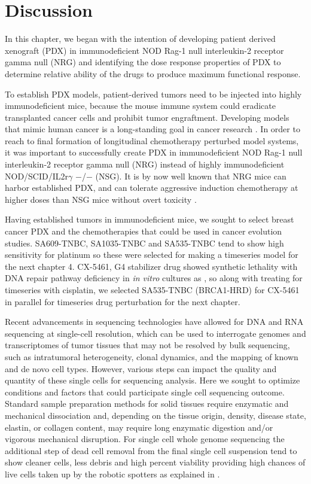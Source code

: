 \section{Discussion}
In this chapter, we began with the intention of developing patient derived xenograft (PDX) in immunodeficient NOD Rag-1 null interleukin-2 receptor gamma null (NRG) and identifying the dose response properties of PDX to determine relative ability of the drugs to produce maximum functional response.

To establish PDX models, patient-derived tumors need to be injected into highly immunodeficient mice, because the mouse immune system could eradicate transplanted cancer cells and prohibit tumor engraftment. Developing models that mimic human cancer is a long-standing goal in cancer research \cite{aparicio2015examining, may2018cancer, ryu2019integrative}. In order to reach to final formation of longitudinal chemotherapy perturbed model systems, it was important to successfully create PDX in immunodeficient NOD Rag-1 null interleukin-2 receptor gamma null (NRG) instead of highly immunodeficient NOD/SCID/IL2r$\gamma$ $-$/$-$ (NSG). It is by now well known that \ac{NRG} mice can harbor established PDX, and can tolerate aggressive induction chemotherapy at higher doses than NSG mice without overt toxicity \cite{barve2018comparative}. 


Having established tumors in immunodeficient mice, we sought to select breast cancer \ac{PDX} and the chemotherapies that could be used in cancer evolution studies. SA609-TNBC, SA1035-TNBC and SA535-TNBC tend to show high sensitivity for platinum so these were selected for making a timeseries model for the next chapter 4. CX-5461, G4 stabilizer drug showed synthetic lethality with DNA repair pathway deficiency in \textit{in vitro} cultures as \cite{xu2017cx}, so along with treating for timeseries with cisplatin, we selected SA535-TNBC (BRCA1-HRD) for CX-5461 in parallel for timeseries drug perturbation for the next chapter.

Recent advancements in sequencing technologies have allowed for DNA and RNA sequencing at single-cell resolution, which can be used to interrogate genomes and transcriptomes of tumor tissues that may not be resolved by bulk sequencing, such as intratumoral heterogeneity, clonal dynamics, and the mapping of known and de novo cell types. However, various steps can impact the quality and quantity of these single cells for sequencing analysis.
Here we sought to optimize conditions and factors that could participate single cell sequencing outcome. Standard sample preparation methods for solid tissues require enzymatic and mechanical dissociation and, depending on the tissue origin, density, disease state, elastin, or collagen content, may require long enzymatic digestion and/or vigorous mechanical disruption.
For single cell whole genome sequencing the additional step of dead cell removal from the final single cell suspension tend to show  cleaner cells, less debris and high percent viability providing high chances of live cells taken up by the robotic spotters as explained in \cite{laks2019clonal}. 

